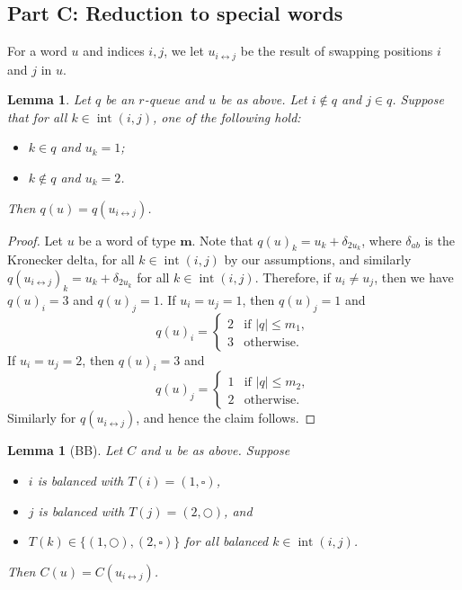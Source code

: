 \documentclass[reqno]{amsart}
\newcommand{\0}{\phantom{c}}
\DeclareMathOperator{\inter}{int} %
\newcommand{\mm}{\mathbf{m}}
\theoremstyle{plain}
\newtheorem{lemma}[thm]{Lemma}
\theoremstyle{definition}
\numberwithin{equation}{section}
\begin{document}
\subsection*{Part C: Reduction to special words}

For a word $u$ and indices $i,j$, we let $u_{i\leftrightarrow j}$ be the result of swapping positions $i$ and $j$ in $u$.

\begin{lemma}
\label{le:orig}
  Let $q$ be an $r$-queue and $u$ be as above.
  Let $i \notin q$ and $j \in q$.
  Suppose that for all $k \in \inter(i,j)$, one of the following hold:
  \begin{itemize}
    \item $k \in q$ and $u_k=1$;
    \item $k \notin q$ and $u_k = 2$.
  \end{itemize}
  Then $q(u) = q(u_{i\leftrightarrow j})$.
\end{lemma}

\begin{proof}
Let $u$ be a word of type $\mm$.
Note that $q(u)_k = u_k + \delta_{2u_k}$, where $\delta_{ab}$ is the Kronecker delta, for all $k \in \inter(i,j)$ by our assumptions, and similarly $q(u_{i \leftrightarrow j})_k = u_k + \delta_{2u_k}$ for all $k \in \inter(i,j)$.
Therefore, if $u_i \neq u_j$, then we have $q(u)_i = 3$ and $q(u)_j = 1$.
If $u_i = u_j = 1$, then $q(u)_j = 1$ and
\[
q(u)_i = \begin{cases}
2 & \text{if }\lvert q \rvert \leq m_1, \\
3 & \text{otherwise.}
\end{cases}
\]
If $u_i = u_j = 2$, then $q(u)_i = 3$ and
\[
q(u)_j = \begin{cases}
1 & \text{if }\lvert q \rvert \leq m_2, \\
2 & \text{otherwise.}
\end{cases}
\]
Similarly for $q(u_{i \leftrightarrow j})$, and hence the claim follows.
\end{proof}

\begin{lemma}[BB]
\label{le:BB}
  Let $C$ and $u$ be as above.
  Suppose
  \begin{itemize}
    \item $i$ is balanced with $T(i) = (1,\square)$,
    \item $j$ is balanced with $T(j) = (2,\bigcirc)$, and
    \item $T(k) \in \{(1,\bigcirc),(2,\square)\}$ for all balanced $k\in\inter(i,j)$.
  \end{itemize}
  Then $C(u) = C(u_{i \leftrightarrow j})$.
\end{lemma}
\end{document}
